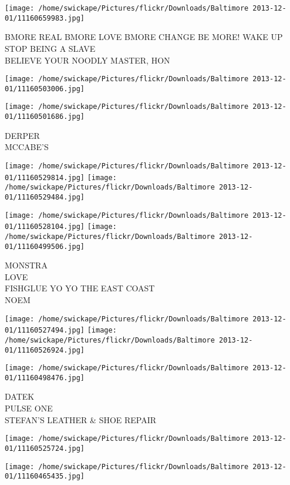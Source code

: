 \documentclass[10pt,letterpaper]{article}
\begin{document}
\vspace{0.25in}
\texttt{[image: /home/swickape/Pictures/flickr/Downloads/Baltimore 2013-12-01/11160659983.jpg]}

BMORE REAL BMORE LOVE BMORE CHANGE BE MORE! WAKE UP\\
STOP BEING A SLAVE\\
BELIEVE YOUR NOODLY MASTER, HON
\pagebreak

\texttt{[image: /home/swickape/Pictures/flickr/Downloads/Baltimore 2013-12-01/11160503006.jpg]}

\vspace{0.25in}
\texttt{[image: /home/swickape/Pictures/flickr/Downloads/Baltimore 2013-12-01/11160501686.jpg]}

DERPER\\
MCCABE'S
\pagebreak

\texttt{[image: /home/swickape/Pictures/flickr/Downloads/Baltimore 2013-12-01/11160529814.jpg]}
\texttt{[image: /home/swickape/Pictures/flickr/Downloads/Baltimore 2013-12-01/11160529484.jpg]}

\texttt{[image: /home/swickape/Pictures/flickr/Downloads/Baltimore 2013-12-01/11160528104.jpg]}
\texttt{[image: /home/swickape/Pictures/flickr/Downloads/Baltimore 2013-12-01/11160499506.jpg]}

MONSTRA\\
LOVE\\
FISHGLUE YO YO THE EAST COAST\\
NOEM
\pagebreak

\texttt{[image: /home/swickape/Pictures/flickr/Downloads/Baltimore 2013-12-01/11160527494.jpg]}
\texttt{[image: /home/swickape/Pictures/flickr/Downloads/Baltimore 2013-12-01/11160526924.jpg]}

\vspace{0.25in}
\texttt{[image: /home/swickape/Pictures/flickr/Downloads/Baltimore 2013-12-01/11160498476.jpg]}

DATEK\\
PULSE ONE\\
STEFAN'S LEATHER \& SHOE REPAIR
\pagebreak

\texttt{[image: /home/swickape/Pictures/flickr/Downloads/Baltimore 2013-12-01/11160525724.jpg]}

\vspace{0.25in}
\texttt{[image: /home/swickape/Pictures/flickr/Downloads/Baltimore 2013-12-01/11160465435.jpg]}
\end{document}
